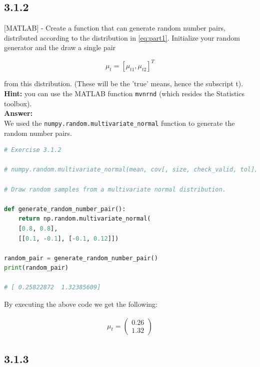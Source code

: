 \documentclass[a4paper]{article}
\begin{document}
\subsection*{3.1.2}

[MATLAB] - Create a function that can generate random number pairs, distributed according to the distribution in \ref{eq:part1}. Initialize your random generator and the draw a single pair

\begin{equation}
	\mu_t = [\mu_{t1}, \mu_{t2}]^T
\end{equation}

from this distribution. (These will be the 'true' means, hence the subscript t).\\

\textbf{Hint:} you can use the MATLAB function \texttt{mvnrnd} (which resides the Statistics toolbox).\\

\textbf{Answer:}\\

We used the \texttt{numpy.random.multivariate\_normal} function to generate the random number pairs.

\begin{lstlisting}[language=Python]
# Exercise 3.1.2

# numpy.random.multivariate_normal(mean, cov[, size, check_valid, tol])

# Draw random samples from a multivariate normal distribution.

def generate_random_number_pair():
    return np.random.multivariate_normal(
    [0.8, 0.8],
    [[0.1, -0.1], [-0.1, 0.12]])

random_pair = generate_random_number_pair()
print(random_pair)

# [ 0.25822872  1.32385609]
\end{lstlisting}

By executing the above code we get the following:

\begin{align*}
	\mu_t = \begin{pmatrix}0.26 \\ 1.32 \end{pmatrix}
\end{align*}

\subsection*{3.1.3}
\end{document}
